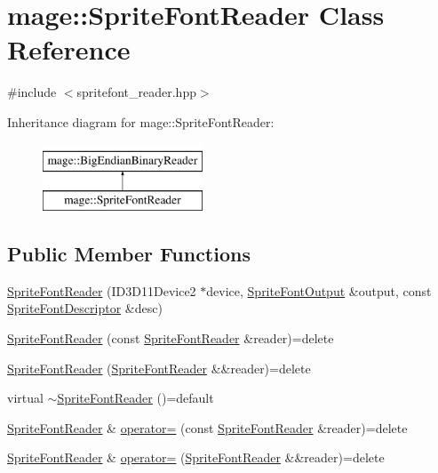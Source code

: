\hypertarget{classmage_1_1_sprite_font_reader}{}\section{mage\+:\+:Sprite\+Font\+Reader Class Reference}
\label{classmage_1_1_sprite_font_reader}


{\ttfamily \#include $<$spritefont\+\_\+reader.\+hpp$>$}

Inheritance diagram for mage\+:\+:Sprite\+Font\+Reader\+:\begin{figure}[H]
\begin{center}
\leavevmode
\includegraphics[height=2.000000cm]{classmage_1_1_sprite_font_reader}
\end{center}
\end{figure}
\subsection*{Public Member Functions}
\begin{DoxyCompactItemize}
\item 
\hyperlink{classmage_1_1_sprite_font_reader_ab257bc3c1f787182c14da56545ff6d10}{Sprite\+Font\+Reader} (I\+D3\+D11\+Device2 $\ast$device, \hyperlink{structmage_1_1_sprite_font_output}{Sprite\+Font\+Output} \&output, const \hyperlink{structmage_1_1_sprite_font_descriptor}{Sprite\+Font\+Descriptor} \&desc)
\item 
\hyperlink{classmage_1_1_sprite_font_reader_a81f2b8ceab31ea5006d2bef498a03bbc}{Sprite\+Font\+Reader} (const \hyperlink{classmage_1_1_sprite_font_reader}{Sprite\+Font\+Reader} \&reader)=delete
\item 
\hyperlink{classmage_1_1_sprite_font_reader_a2130816e03384c99af146a21795ac5e8}{Sprite\+Font\+Reader} (\hyperlink{classmage_1_1_sprite_font_reader}{Sprite\+Font\+Reader} \&\&reader)=delete
\item 
virtual \hyperlink{classmage_1_1_sprite_font_reader_a296715f88672f810a6e4b74f74840c53}{$\sim$\+Sprite\+Font\+Reader} ()=default
\item 
\hyperlink{classmage_1_1_sprite_font_reader}{Sprite\+Font\+Reader} \& \hyperlink{classmage_1_1_sprite_font_reader_a4de55b4bebfabb5f1c32078864baef11}{operator=} (const \hyperlink{classmage_1_1_sprite_font_reader}{Sprite\+Font\+Reader} \&reader)=delete
\item 
\hyperlink{classmage_1_1_sprite_font_reader}{Sprite\+Font\+Reader} \& \hyperlink{classmage_1_1_sprite_font_reader_aae3c6305ea97146bd85b2d93a037d47d}{operator=} (\hyperlink{classmage_1_1_sprite_font_reader}{Sprite\+Font\+Reader} \&\&reader)=delete
\end{DoxyCompactItemize}

